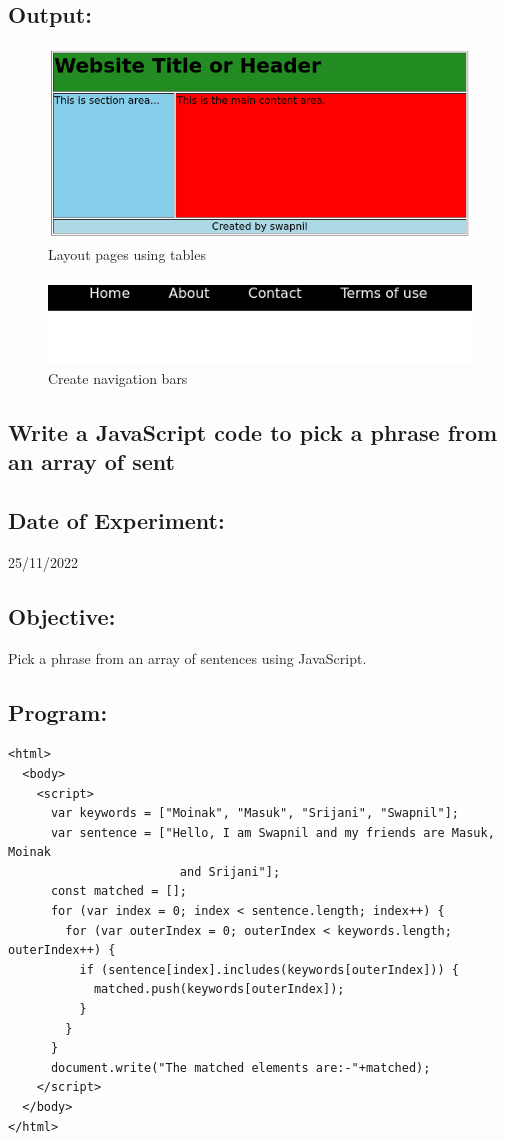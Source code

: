 \documentclass[12pt, a4paper]{article}
\begin{document}
\subsection*{Output:}
\vskip10pt
\setcounter{figure}{0}
\begin{figure}[h]
  \centering
  \includegraphics[width=\textwidth]{11}
  \caption{Layout pages using tables}
\end{figure}
\begin{figure}[h]
  \centering
  \includegraphics[width=\textwidth]{12}
  \caption{Create navigation bars}
\end{figure}

\pagebreak

\begin{tcolorbox}
  \section{Write a JavaScript code to pick a phrase from an array of sent}
\end{tcolorbox}
\subsection*{Date of Experiment:}
25/11/2022
\subsection*{Objective:}
Pick a phrase from an array of sentences using JavaScript.

\subsection*{Program:}
\begin{lstlisting}
<html>
  <body>
    <script>
      var keywords = ["Moinak", "Masuk", "Srijani", "Swapnil"];
      var sentence = ["Hello, I am Swapnil and my friends are Masuk, Moinak
                        and Srijani"];
      const matched = [];
      for (var index = 0; index < sentence.length; index++) {
        for (var outerIndex = 0; outerIndex < keywords.length; outerIndex++) {
          if (sentence[index].includes(keywords[outerIndex])) {
            matched.push(keywords[outerIndex]);
          }
        }
      }
      document.write("The matched elements are:-"+matched);
    </script>
  </body>
</html>
\end{lstlisting}
\end{document}
